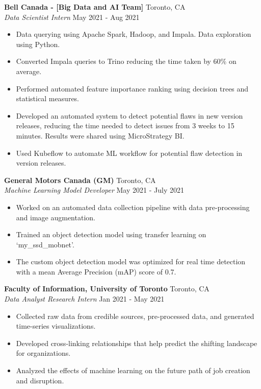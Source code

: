 \documentclass[a4paper]{article}
\begin{document}
\textbf{Bell Canada - [Big Data and AI Team]} \hfill Toronto, CA\\
\textit{Data Scientist Intern} \hfill May 2021 - Aug 2021\\
\vspace{-1mm}
\begin{itemize} \itemsep 1pt
	\item Data querying using Apache Spark, Hadoop, and Impala. Data exploration using Python.
	\item Converted Impala queries to Trino reducing the time taken by 60\% on average.
	\item Performed automated feature importance ranking using decision trees and statistical measures.
	\item Developed an automated system to detect potential flaws in new version releases, reducing the time needed to detect issues from 3 weeks to 15 minutes. Results were shared using MicroStrategy BI.
	\item Used Kubeflow to automate ML workflow for potential flaw detection in version releases.
\end{itemize}
\textbf{General Motors Canada (GM)} \hfill Toronto, CA\\
\textit{Machine Learning Model Developer} \hfill May 2021 - July 2021\\
\vspace{-1mm}
\begin{itemize} \itemsep 1pt
	\item Worked on an automated data collection pipeline with data pre-processing and image augmentation.
	\item Trained an object detection model using transfer learning on ‘my\_ssd\_mobnet’.
	\item The custom object detection model was optimized for real time detection with a mean Average Precision (mAP) score of 0.7.
\end{itemize}
\textbf{Faculty of Information, University of Toronto} \hfill Toronto, CA\\
\textit{Data Analyst Research Intern} \hfill Jan 2021 - May 2021\\
\vspace{-1mm}
\begin{itemize} \itemsep 1pt
	\item Collected raw data from credible sources, pre-processed data, and generated time-series visualizations.
	\item Developed cross-linking relationships that help predict the shifting landscape for organizations.
	\item Analyzed the effects of machine learning on the future path of job creation and disruption.
\end{itemize}
\end{document}

